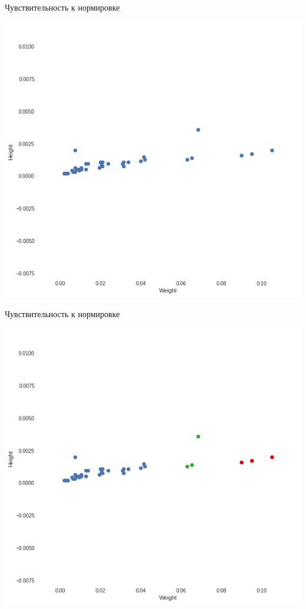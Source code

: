 \documentclass[10pt]{beamer}
\begin{document}
\begin{frame}{Чувствительность к нормировке}
	\begin{center}
	  \includegraphics[height=0.8 \textheight, keepaspectratio = true]{images/weight_height3}  
	\end{center}
\end{frame}

\begin{frame}{Чувствительность к нормировке}
	\begin{center}
	  \includegraphics[height=0.8 \textheight, keepaspectratio = true]{images/weight_height4}  
	\end{center}
\end{frame}
\end{document}
